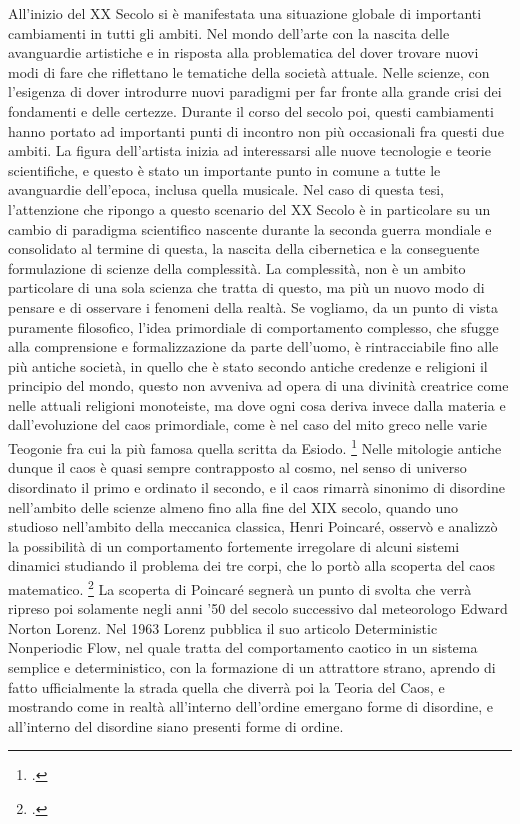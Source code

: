 All'inizio del XX Secolo si è manifestata una situazione globale
di importanti cambiamenti in tutti gli ambiti.
Nel mondo dell'arte con la nascita delle avanguardie artistiche e
in risposta alla problematica del dover trovare nuovi modi di fare
che riflettano le tematiche della società attuale.
Nelle scienze, con l'esigenza di dover introdurre nuovi paradigmi
per far fronte alla grande crisi dei fondamenti e delle certezze.
Durante il corso del secolo poi, questi cambiamenti hanno portato
ad importanti punti di incontro non più occasionali fra questi due ambiti.
La figura dell'artista inizia ad interessarsi alle nuove tecnologie
e teorie scientifiche, e questo è stato un importante punto in comune a tutte
le avanguardie dell'epoca, inclusa quella musicale.
Nel caso di questa tesi, l'attenzione che ripongo a questo scenario
del XX Secolo
è in particolare su un cambio di paradigma scientifico
nascente durante la seconda guerra mondiale e consolidato al termine di questa,
la nascita della cibernetica e la conseguente formulazione
di scienze della complessità.
La complessità, non è un ambito particolare
di una sola scienza che tratta di questo,
ma più un nuovo modo di pensare e di osservare i fenomeni
della realtà.
Se vogliamo, da un punto di vista puramente filosofico,
l'idea primordiale di comportamento complesso,
che sfugge alla comprensione e formalizzazione da parte dell'uomo,
è rintracciabile fino alle più antiche società,
in quello che è stato secondo antiche credenze e religioni il principio del mondo,
questo non avveniva ad opera di una divinità creatrice come nelle attuali
religioni monoteiste,
ma dove ogni cosa deriva invece dalla materia e
dall’evoluzione del caos primordiale,
come è nel caso del mito greco nelle varie Teogonie
fra cui la più famosa quella scritta da Esiodo. \footcite{esiodoteogonia}
Nelle mitologie antiche dunque il caos è quasi sempre
contrapposto al cosmo, nel senso di universo disordinato il primo e ordinato
il secondo, e il caos rimarrà sinonimo di disordine
nell'ambito delle scienze almeno fino alla fine del XIX secolo,
quando uno studioso nell'ambito della meccanica classica, Henri Poincaré,
osservò e analizzò la possibilità di un comportamento fortemente irregolare
di alcuni sistemi dinamici studiando il problema dei tre corpi,
che lo portò alla scoperta del caos matematico. \footcite{poincaréproblema}
La scoperta di Poincaré segnerà un punto di svolta che verrà
ripreso poi solamente negli anni '50 del secolo successivo dal meteorologo
Edward Norton Lorenz.
Nel 1963 Lorenz pubblica il suo articolo Deterministic Nonperiodic Flow,
nel quale tratta del comportamento caotico in un sistema semplice
e deterministico, con la formazione di un attrattore strano,
aprendo di fatto ufficialmente la strada quella che diverrà poi
la Teoria del Caos,
e mostrando come in realtà all'interno dell'ordine emergano forme di disordine,
e all'interno del disordine siano presenti forme di ordine.

